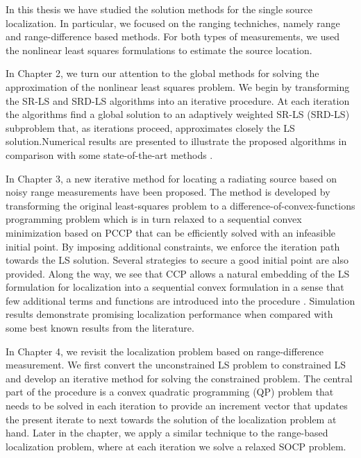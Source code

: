 
In this thesis we have studied the solution methods for the single source localization. In particular, we focused on the ranging techniches, namely range and range-difference based methods. For both types of measurements, we used the nonlinear least squares formulations to estimate the source location. 

In Chapter 2, we turn our attention to the global methods for solving the approximation of the nonlinear least squares problem. We begin by
transforming the SR-LS and SRD-LS algorithms \cite{BeckStLi} into an
iterative procedure. At each iteration the algorithms find a global solution to an  adaptively weighted SR-LS (SRD-LS) subproblem that, as iterations proceed, approximates closely the LS solution.Numerical results are presented to illustrate the proposed algorithms in comparison with some state-of-the-art methods \cite{IRWSg}.


In Chapter 3,  a new iterative method for locating a radiating source based on noisy range measurements have been proposed. The method is developed by transforming the original least-squares problem to a difference-of-convex-functions programming problem which is in turn relaxed to a sequential convex minimization based on PCCP that can be efficiently solved with an infeasible initial point. By imposing additional constraints, we  enforce the iteration path towards the LS solution. Several strategies to secure a good initial point are also provided.  Along the way, we see that CCP allows a natural embedding of the LS formulation for localization into a sequential convex formulation in a sense that few additional terms and functions are introduced into the procedure \cite{PCCP}. Simulation results demonstrate promising localization performance when compared with some best known results from the literature.

In Chapter 4, we revisit the localization problem based on range-difference measurement. We first convert the unconstrained LS problem to constrained LS and develop an iterative method for solving the constrained problem.  The central part of the procedure is a convex quadratic programming (QP) problem that needs to be solved in each iteration to provide an increment vector that updates the present iterate to next towards the solution of the localization problem at hand. Later in the chapter, we apply a similar technique to the range-based localization problem, where at each iteration we solve a relaxed SOCP problem.


